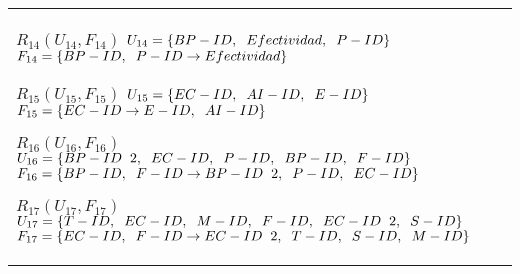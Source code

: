 \documentclass{report}
\begin{document}
\begin{tabularx}{\textwidth}{|X|}
        $ R_{14} ( U_{14} , F_{14} ) $ \newline 
        $ U_{14} = \{{BP-ID, \hspace{0.2cm}  Efectividad, \hspace{0.2cm}  P-ID}\} $ \newline 
        $ F_{14} = \{BP-ID, \hspace{0.2cm} P-ID \rightarrow Efectividad \} $\newline 
        
        $ R_{15} ( U_{15} , F_{15} ) $ \newline 
        $ U_{15} = \{{EC-ID, \hspace{0.2cm}  AI-ID, \hspace{0.2cm}  E-ID}\} $ \newline 
        $ F_{15} = \{EC-ID \rightarrow E-ID, \hspace{0.2cm} AI-ID \} $\newline 
        
        $ R_{16} ( U_{16} , F_{16} ) $ \newline 
        $ U_{16} = \{{BP-ID \hspace{0.2cm} 2, \hspace{0.2cm}  EC-ID, \hspace{0.2cm}  P-ID, \hspace{0.2cm}  BP-ID, \hspace{0.2cm}  F-ID}\} $ \newline 
        $ F_{16} = \{BP-ID, \hspace{0.2cm} F-ID \rightarrow BP-ID \hspace{0.2cm} 2, \hspace{0.2cm} P-ID, \hspace{0.2cm} EC-ID \} $\newline 
        
        $ R_{17} ( U_{17} , F_{17} ) $ \newline 
        $ U_{17} = \{{T-ID, \hspace{0.2cm}  EC-ID, \hspace{0.2cm}  M-ID, \hspace{0.2cm}  F-ID, \hspace{0.2cm}  EC-ID \hspace{0.2cm} 2, \hspace{0.2cm}  S-ID}\} $ \newline 
        $ F_{17} = \{EC-ID, \hspace{0.2cm} F-ID \rightarrow EC-ID \hspace{0.2cm} 2, \hspace{0.2cm} T-ID, \hspace{0.2cm} S-ID, \hspace{0.2cm} M-ID \} $\newline 
        

\end{tabularx}
\end{document}

